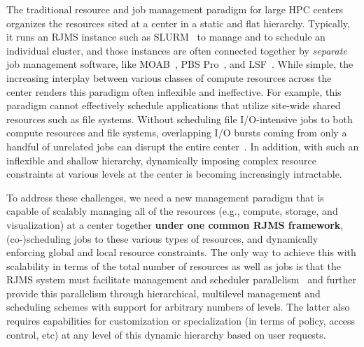 The traditional resource and job management paradigm
for large HPC centers organizes the resources sited
at a center in a static and flat hierarchy. Typically, it 
runs an RJMS instance such as SLURM~\cite{Jette02slurm}
to manage and to schedule an individual cluster,
and those instances are often connected
together by {\em separate} job management software, 
like MOAB~\cite{MOAB}, PBS Pro~\cite{PSBPro}, and LSF~\cite{LSF}.
While simple, the increasing interplay 
between various classes of compute resources 
across the center renders this paradigm often
inflexible and ineffective. 
For example, this paradigm cannot effectively
schedule applications that utilize site-wide shared 
resources such as file systems. 
Without scheduling file I/O-intensive jobs 
to both compute resources and file systems, 
overlapping I/O bursts coming from only a handful of 
unrelated jobs can disrupt the entire center~\cite{SCR,SPINDLE}. 
In addition, with such an inflexible and shallow hierarchy, 
dynamically imposing complex 
resource constraints at various levels at the center
is becoming increasingly intractable. 

To address these challenges, we need 
a new management paradigm that is capable of scalably managing 
all of the resources (e.g., compute, storage, and visualization)
at a center together {\bf under one common RJMS framework},
(co-)scheduling jobs to these various types of resources, and 
dynamically enforcing global and local resource constraints. 
The only way to achieve this with scalability in terms of the total number 
of resources as well as jobs is that the RJMS system must
facilitate management and scheduler parallelism~\cite{Omega,Mesos}
and further provide this parallelism through hierarchical, multilevel 
management and scheduling schemes with support for arbitrary numbers of levels.
The latter also requires capabilities for customization or specialization (in terms
of policy, access control, etc) at any level of this dynamic hierarchy 
based on user requests.

